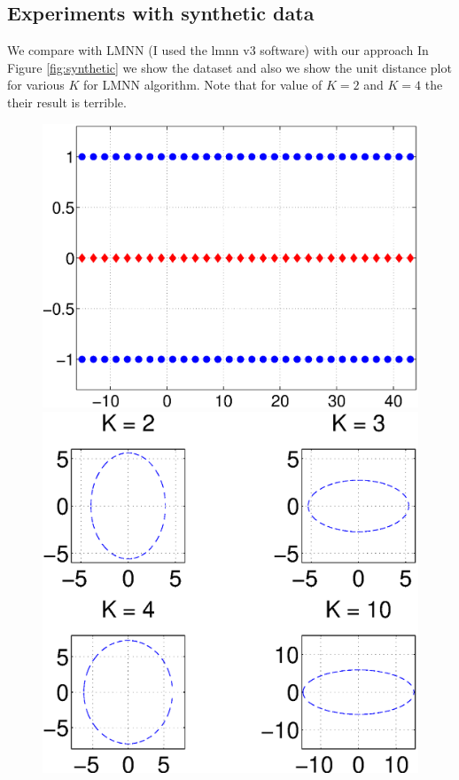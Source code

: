 \documentclass{article}
\begin{document}
 
 
 

\clearpage
\subsection{Experiments with synthetic data}


We compare with LMNN (I used the lmnn v3 software)
with our approach
In Figure \ref{fig:synthetic} we show the dataset
and also we show the unit distance plot for various $K$ for LMNN algorithm.
Note that for value of $K=2$ and $K=4$ the their result is terrible.
\begin{figure}[h!]

\includegraphics[scale=.2]{fig/synthetic1.eps}
\includegraphics[scale=.3]{fig/synthetic1lmnn.eps}

\end{figure}
\end{document}
